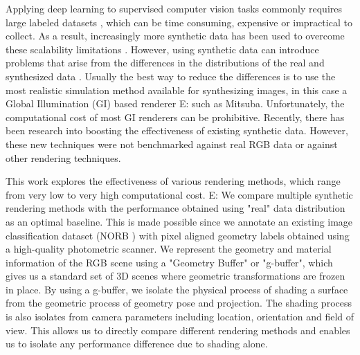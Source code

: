 \documentclass[10pt,twocolumn,letterpaper]{article}
\newcommand{\tompson}[1]{{\color{green} JT: #1}}
\newcommand{\edit}[1]{{\color{red} E: #1}}
\begin{document}
Applying deep learning to supervised computer vision tasks commonly requires large labeled datasets \cite{imagenet, coco}, which can be time consuming, expensive or impractical to collect. As a result, increasingly more synthetic data has been used to overcome these scalability limitations \cite{DBLP:journals/corr/RichterVRK16, DBLP:journals/corr/ShafaeiLS16, DBLP:journals/corr/ZhangSYSLJF16, DBLP:journals/corr/SixtWL17}. However, using synthetic data can introduce problems that arise from the differences in the distributions of the real and synthesized data \cite{2014arXiv1409.7495G}. Usually the best way to reduce the differences is to use the most realistic simulation method available for synthesizing images, in this case a Global Illumination (GI) based renderer \edit{such as Mitsuba\cite{Mitsuba}.}  Unfortunately, the computational cost of most GI renderers can be prohibitive.  Recently, there has been research into boosting the effectiveness of existing synthetic data\cite{DBLP:journals/corr/ShrivastavaPTSW16}.  However, these new techniques were not benchmarked against real RGB data or against other rendering techniques.

This work explores the effectiveness of various rendering methods, which range from very low to very high computational cost. \edit{We compare multiple synthetic rendering methods with the performance obtained using "real" data distribution as an optimal baseline. This is made possible since we annotate an existing image classification dataset (NORB \cite{LeCun:2004:LMG:1896300.1896315}) with pixel aligned geometry labels obtained using a high-quality photometric scanner. We represent the geometry and material information of the RGB scene using a "Geometry Buffer" or "g-buffer", which gives us a standard set of 3D scenes where geometric transformations are frozen in place. By using a g-buffer, we isolate the physical process of shading a surface from the geometric process of geometry pose and projection.  The shading process is also isolates from camera parameters including location, orientation and field of view. This allows us to directly compare different rendering methods and enables us to isolate any performance difference due to shading alone. }
\end{document}
